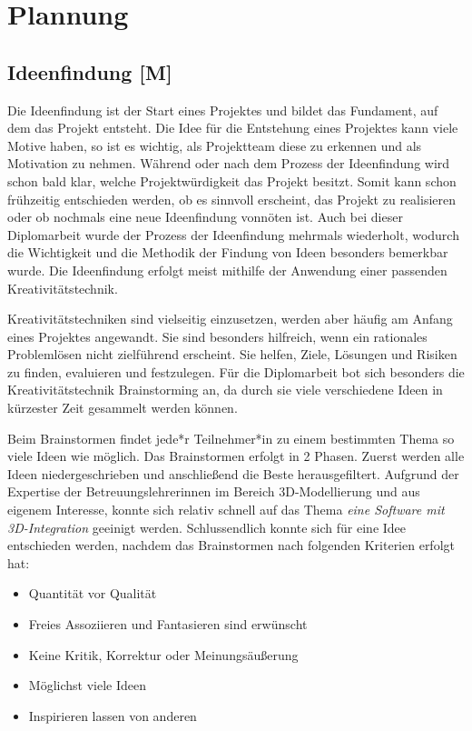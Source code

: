 \section{Plannung}

\subsection{Ideenfindung [M]}
Die Ideenfindung ist der Start eines Projektes und bildet das Fundament, auf dem das Projekt entsteht. Die Idee für die Entstehung eines Projektes kann viele Motive haben, so ist es wichtig, als Projektteam diese zu erkennen und als Motivation zu nehmen. Während oder nach dem Prozess der Ideenfindung wird schon bald klar, welche Projektwürdigkeit das Projekt besitzt. Somit kann schon frühzeitig entschieden werden, ob es sinnvoll erscheint, das Projekt zu realisieren oder ob nochmals eine neue Ideenfindung vonnöten ist. Auch bei dieser Diplomarbeit wurde der Prozess der Ideenfindung mehrmals wiederholt, wodurch die Wichtigkeit und die Methodik der Findung von Ideen besonders bemerkbar wurde. Die Ideenfindung erfolgt meist mithilfe der Anwendung einer passenden Kreativitätstechnik.

Kreativitätstechniken sind vielseitig einzusetzen, werden aber häufig am Anfang eines Projektes angewandt. Sie sind besonders hilfreich, wenn ein rationales Problemlösen nicht zielführend erscheint. Sie helfen, Ziele, Lösungen und Risiken zu finden, evaluieren und festzulegen. Für die Diplomarbeit bot sich besonders die Kreativitätstechnik Brainstorming an, da durch sie viele verschiedene Ideen in kürzester Zeit gesammelt werden können.

Beim Brainstormen findet jede*r Teilnehmer*in zu einem bestimmten Thema so viele Ideen wie möglich. Das Brainstormen erfolgt in 2 Phasen. Zuerst werden alle Ideen niedergeschrieben und anschließend die Beste herausgefiltert. Aufgrund der Expertise der Betreuungslehrerinnen im Bereich 3D-Modellierung und aus eigenem Interesse, konnte sich relativ schnell auf das Thema \emph{eine Software mit 3D-Integration} geeinigt werden. Schlussendlich konnte sich für eine Idee entschieden werden, nachdem das Brainstormen nach folgenden Kriterien erfolgt hat:
\begin{itemize}
    \item Quantität vor Qualität
    \item Freies Assoziieren und Fantasieren sind erwünscht
    \item Keine Kritik, Korrektur oder Meinungsäußerung
    \item Möglichst viele Ideen
    \item Inspirieren lassen von anderen
\end{itemize}
\cite{Ideenfindung}

